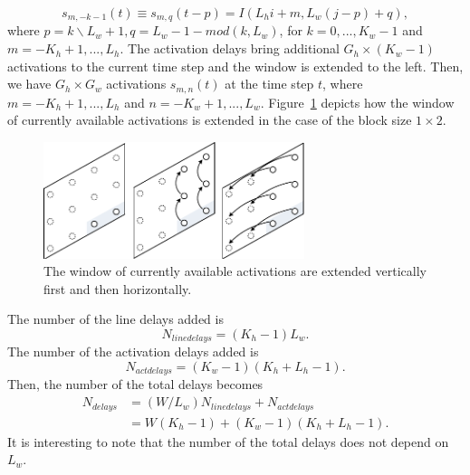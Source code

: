 \documentclass[journal]{IEEEtran}
\begin{document}
\begin{equation}
	s_{m,-k-1}(t) \equiv
	s_{m,q}(t-p) = I(L_hi+m, L_w (j-p)+q),
\end{equation}
where $p=k\backslash L_w+1,q=L_w-1-mod(k,L_w)$, for $k=0, ..., K_w-1$ and $m=-K_h+1,...,L_h$. The activation delays bring additional $G_h \times (K_w-1)$ activations to the current time step and the window is extended to the left. Then, we have $G_h \times G_w$ activations $s_{m,n}(t)$ at the time step $t$, where $m=-K_h+1,...,L_h$ and $n=-K_w+1,...,L_w$.  Figure~\ref{popgroup} depicts how the window of currently available activations is extended in the case of the block size $1\times2$.
\begin{figure}[h]
\centering
\includegraphics[width = 3in]{./FIGURES/fig5.pdf}
\caption {The window of currently available activations are extended vertically first and then horizontally.} \label{popgroup}
\end{figure} 
The number of the line delays added is
\begin{equation}
N_{linedelays} = (K_h-1)L_w.
\end{equation}
The number of the activation delays added is
\begin{equation}
N_{actdelays} = (K_w-1)(K_h+L_h-1).
\end{equation}
Then, the number of the total delays becomes
\begin{equation}
\begin{split}
N_{delays}& =  (W/L_w) N_{linedelays} + N_{actdelays}\\
 & = W(K_h-1) + (K_w-1)(K_h+L_h-1) .
\end{split}
\end{equation}
It is interesting to note that the number of the total delays does not depend on $L_w$.
\end{document}
